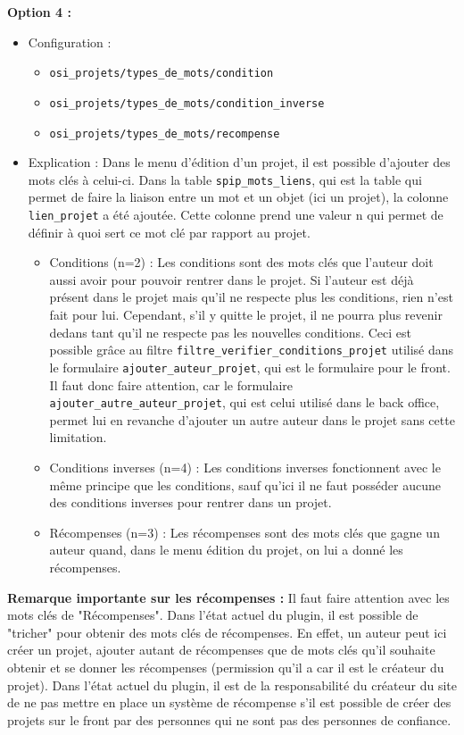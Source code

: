 \textbf{Option 4 :} 
\begin{itemize}
    \item Configuration : 
    \begin{itemize}
        \item \texttt{osi\_projets/types\_de\_mots/condition}
        \item \texttt{osi\_projets/types\_de\_mots/condition\_inverse}
        \item \texttt{osi\_projets/types\_de\_mots/recompense}
    \end{itemize}

    \item Explication : Dans le menu d'édition d'un projet, il est possible d'ajouter des mots clés à celui-ci. Dans la table \texttt{spip\_mots\_liens}, qui est la table qui permet de faire la liaison entre un mot et un objet (ici un projet), la colonne \texttt{lien\_projet} a été ajoutée. Cette colonne prend une valeur n qui permet de définir à quoi sert ce mot clé par rapport au projet.
    \begin{itemize}
        \item Conditions (n=2) : Les conditions sont des mots clés que l'auteur doit aussi avoir pour pouvoir rentrer dans le projet. Si l'auteur est déjà présent dans le projet mais qu'il ne respecte plus les conditions, rien n'est fait pour lui. Cependant, s'il y quitte le projet, il ne pourra plus revenir dedans tant qu'il ne respecte pas les nouvelles conditions. Ceci est possible grâce au filtre \texttt{filtre\_verifier\_conditions\_projet} utilisé dans le formulaire \texttt{ajouter\_auteur\_projet}, qui est le formulaire pour le front. Il faut donc faire attention, car le formulaire \texttt{ajouter\_autre\_auteur\_projet}, qui est celui utilisé dans le back office, permet lui en revanche d'ajouter un autre auteur dans le projet sans cette limitation.
        \item Conditions inverses (n=4) : Les conditions inverses fonctionnent avec le même principe que les conditions, sauf qu'ici il ne faut posséder aucune des conditions inverses pour rentrer dans un projet.
        \item Récompenses (n=3) : Les récompenses sont des mots clés que gagne un auteur quand, dans le menu édition du projet, on lui a donné les récompenses.
    \end{itemize}
\end{itemize}

\textbf{Remarque importante sur les récompenses :} Il faut faire attention avec les mots clés de "Récompenses". Dans l'état actuel du plugin, il est possible de "tricher" pour obtenir des mots clés de récompenses. En effet, un auteur peut ici créer un projet, ajouter autant de récompenses que de mots clés qu'il souhaite obtenir et se donner les récompenses (permission qu'il a car il est le créateur du projet). Dans l'état actuel du plugin, il est de la responsabilité du créateur du site de ne pas mettre en place un système de récompense s'il est possible de créer des projets sur le front par des personnes qui ne sont pas des personnes de confiance.


